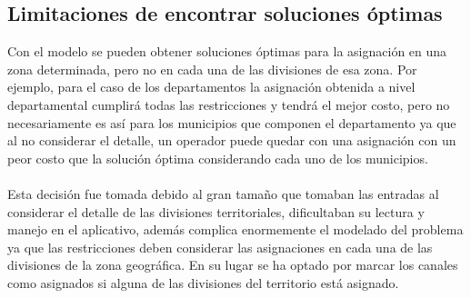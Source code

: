 \subsection{Limitaciones de encontrar soluciones óptimas}

Con el modelo se pueden obtener soluciones óptimas para la asignación en una zona determinada, pero no en cada una de las divisiones de esa zona. Por ejemplo, para el caso de los departamentos la asignación obtenida a nivel departamental cumplirá todas las restricciones y tendrá el mejor costo, pero no necesariamente es así para los municipios que componen el departamento ya que al no considerar el detalle, un operador puede quedar con una asignación con un peor costo que la solución óptima considerando cada uno de los municipios.
\\\\
Esta decisión fue tomada debido al gran tamaño que tomaban las entradas al considerar el detalle de las divisiones territoriales, dificultaban su lectura y manejo en el aplicativo, además complica enormemente el modelado del problema ya que las restricciones deben considerar las asignaciones en cada una de las divisiones de la zona geográfica. En su lugar se ha optado por marcar los canales como asignados si alguna de las divisiones del territorio está asignado.

